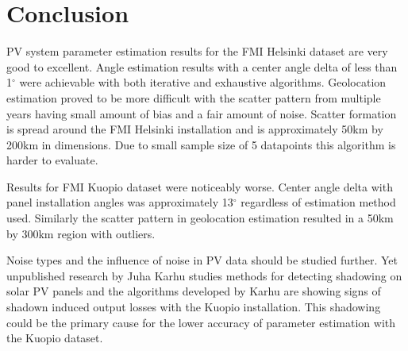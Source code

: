 \chapter{Conclusion}
PV system parameter estimation results for the FMI Helsinki dataset are very good to excellent. Angle estimation results with a center angle delta of less than 1$^\circ$ were achievable with both iterative and exhaustive algorithms. Geolocation estimation proved to be more difficult with the scatter pattern from multiple years having small amount of bias and a fair amount of noise. Scatter formation is spread around the FMI Helsinki installation and is approximately 50km by 200km in dimensions. Due to small sample size of 5 datapoints this algorithm is harder to evaluate.

Results for FMI Kuopio dataset were noticeably worse. Center angle delta with panel installation angles was approximately 13$^\circ$ regardless of estimation method used. Similarly the scatter pattern in geolocation estimation resulted in a 50km by 300km region with outliers.

Noise types and the influence of noise in PV data should be studied further. Yet unpublished research by Juha Karhu studies methods for detecting shadowing on solar PV panels and the algorithms developed by Karhu are showing signs of shadown induced output losses with the Kuopio installation. This shadowing could be the primary cause for the lower accuracy of parameter estimation with the Kuopio dataset.

















